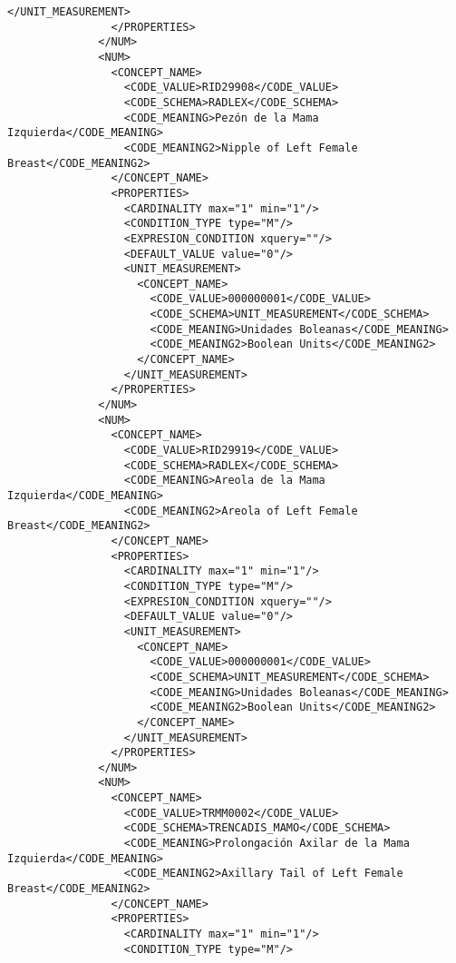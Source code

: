 \begin{lstlisting}[label=some-code,caption=Some Code]
                  </UNIT_MEASUREMENT>
                </PROPERTIES>
              </NUM>
              <NUM>
                <CONCEPT_NAME>
                  <CODE_VALUE>RID29908</CODE_VALUE>
                  <CODE_SCHEMA>RADLEX</CODE_SCHEMA>
                  <CODE_MEANING>Pezón de la Mama Izquierda</CODE_MEANING>
                  <CODE_MEANING2>Nipple of Left Female Breast</CODE_MEANING2>
                </CONCEPT_NAME>
                <PROPERTIES>
                  <CARDINALITY max="1" min="1"/>
                  <CONDITION_TYPE type="M"/>
                  <EXPRESION_CONDITION xquery=""/>
                  <DEFAULT_VALUE value="0"/>
                  <UNIT_MEASUREMENT>
                    <CONCEPT_NAME>
                      <CODE_VALUE>000000001</CODE_VALUE>
                      <CODE_SCHEMA>UNIT_MEASUREMENT</CODE_SCHEMA>
                      <CODE_MEANING>Unidades Boleanas</CODE_MEANING>
                      <CODE_MEANING2>Boolean Units</CODE_MEANING2>
                    </CONCEPT_NAME>
                  </UNIT_MEASUREMENT>
                </PROPERTIES>
              </NUM>
              <NUM>
                <CONCEPT_NAME>
                  <CODE_VALUE>RID29919</CODE_VALUE>
                  <CODE_SCHEMA>RADLEX</CODE_SCHEMA>
                  <CODE_MEANING>Areola de la Mama Izquierda</CODE_MEANING>
                  <CODE_MEANING2>Areola of Left Female Breast</CODE_MEANING2>
                </CONCEPT_NAME>
                <PROPERTIES>
                  <CARDINALITY max="1" min="1"/>
                  <CONDITION_TYPE type="M"/>
                  <EXPRESION_CONDITION xquery=""/>
                  <DEFAULT_VALUE value="0"/>
                  <UNIT_MEASUREMENT>
                    <CONCEPT_NAME>
                      <CODE_VALUE>000000001</CODE_VALUE>
                      <CODE_SCHEMA>UNIT_MEASUREMENT</CODE_SCHEMA>
                      <CODE_MEANING>Unidades Boleanas</CODE_MEANING>
                      <CODE_MEANING2>Boolean Units</CODE_MEANING2>
                    </CONCEPT_NAME>
                  </UNIT_MEASUREMENT>
                </PROPERTIES>
              </NUM>
              <NUM>
                <CONCEPT_NAME>
                  <CODE_VALUE>TRMM0002</CODE_VALUE>
                  <CODE_SCHEMA>TRENCADIS_MAMO</CODE_SCHEMA>
                  <CODE_MEANING>Prolongación Axilar de la Mama Izquierda</CODE_MEANING>
                  <CODE_MEANING2>Axillary Tail of Left Female Breast</CODE_MEANING2>
                </CONCEPT_NAME>
                <PROPERTIES>
                  <CARDINALITY max="1" min="1"/>
                  <CONDITION_TYPE type="M"/>

\end{lstlisting}
